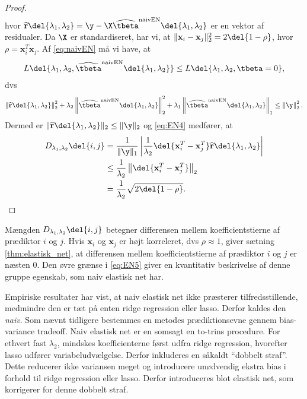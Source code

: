 \begin{proof}
\begin{align}
\end{align}
hvor \(\widehat{\mathbf{r}}\del{\lambda_1, \lambda_2} = \y - \X  \widehat{\tbeta}^\text{naivEN} \del{\lambda_1, \lambda_2}\) er en vektor af residualer.
Da \(\X\) er standardiseret, har vi, at \(\Vert \mathbf{x}_i - \mathbf{x}_j \Vert_2^2=2 \del{1-\rho}\), hvor \(\rho = \mathbf{x}_i^T \mathbf{x}_j\).
Af \eqref{eq:naivEN} må vi have, at
\begin{align*}
L \del{\lambda_1,\lambda_2, \widehat{\tbeta}^\text{naivEN} \del{\lambda_1, \lambda_2}} \leq L \del{\lambda_1,\lambda_2, \tbeta = 0},  
\end{align*}
dvs
\begin{align*}
\left\Vert \widehat{\mathbf{r}} \del{\lambda_1, \lambda_2} \right\Vert_2^2 + \lambda_2 \left\Vert \widehat{\tbeta}^\text{naivEN} \del{\lambda_1, \lambda_2} \right\Vert_2^2 + \lambda_1 \left\Vert \widehat{\tbeta}^\text{naivEN} \del{\lambda_1, \lambda_2} \right\Vert_1 \leq \left\Vert \y \right\Vert_2^2.  
\end{align*}
Dermed er \(\Vert \widehat{\mathbf{r}} \del{\lambda_1, \lambda_2} \Vert_2 \leq \Vert \y \Vert_2\) og \eqref{eq:EN4} medfører, at
\begin{align*}
D_{\lambda_1, \lambda_2} \del{i,j} &= \frac{1}{\Vert \y \Vert_1} \left\vert \frac{1}{\lambda_2} \del{\mathbf{x}_i^T-\mathbf{x}_j^T} \widehat{\mathbf{r}}\del{\lambda_1, \lambda_2} \right\vert \\ 
&\leq \frac{1}{\lambda_2} \left\Vert \del{\mathbf{x}_i^T-\mathbf{x}_j^T} \right\Vert_2 \\ 
&= \frac{1}{\lambda_2} \sqrt{2 \del{1-\rho}}.
\end{align*}
\end{proof}
%
Mængden \(D_{\lambda_1, \lambda_2} \del{i,j}\) betegner differensen mellem koefficientstierne af prædiktor \(i\) og \(j\).
Hvis \(\mathbf{x}_i\) og \(\mathbf{x}_j\) er højt korreleret, dvs \(\rho \approx 1\), giver sætning \ref{thm:elastisk_net}, at differensen mellem koefficientstierne af prædiktor \(i\) og \(j\) er næsten 0.
Den øvre grænse i \eqref{eq:EN5} giver en kvantitativ beskrivelse af denne gruppe egenskab, som naiv elastisk net har.

Empiriske resultater har vist, at naiv elastisk net ikke præsterer tilfredsstillende, medmindre den er tæt på enten ridge regression eller lasso.
Derfor kaldes den \textit{naiv}.
Som nævnt tidligere bestemmes en metodes prædiktionsevne gennem bias-variance tradeoff. 
Naiv elastisk net er en somsagt en to-trins procedure. 
For ethvert fast \(\lambda_2\), mindskes koefficienterne først udfra ridge regression, hvorefter lasso udfører variabeludvælgelse.
Derfor inkluderes en såkaldt ``dobbelt straf''.
Dette reducerer ikke variansen meget og introducere unødvendig ekstra bias i forhold til ridge regression eller lasso.
Derfor introduceres blot elastisk net, som korrigerer for denne dobbelt straf.

